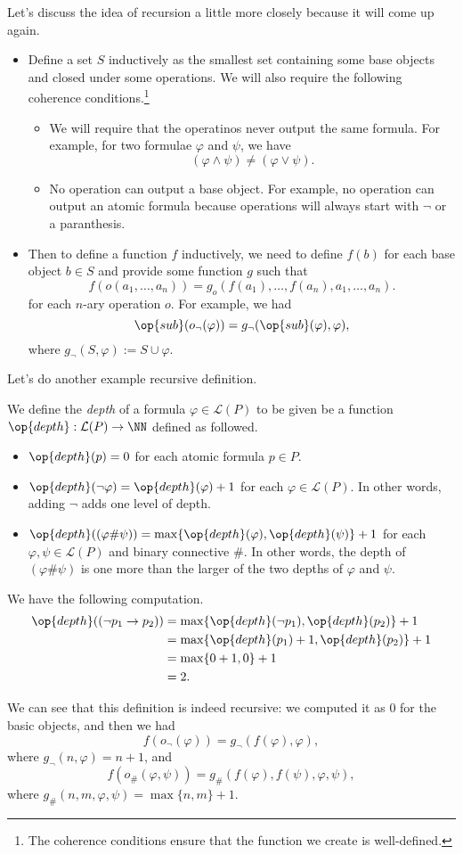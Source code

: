 Let's discuss the idea of recursion a little more closely because it will come up again.
\begin{itemize}
	\item Define a set $S$ inductively as the smallest set containing some base objects and closed under some operations. We will also require the following coherence conditions.\footnote{The coherence conditions ensure that the function we create is well-defined.}
	\begin{itemize}
		\item We will require that the operatinos never output the same formula. For example, for two formulae $\varphi$ and $\psi$, we have
		\[(\varphi\land\psi)\ne(\varphi\lor\psi).\]
		\item No operation can output a base object. For example, no operation can output an atomic formula because operations will always start with $\lnot$ or a paranthesis.
	\end{itemize}
	\item Then to define a function $f$ inductively, we need to define $f(b)$ for each base object $b\in S$ and provide some function $g$ such that
	\[f(o(a_1,\ldots,a_n))=g_o(f(a_1),\ldots,f(a_n),a_1,\ldots,a_n).\]
	for each $n$-ary operation $o$. For example, we had
	\[\op{sub}(o_\lnot(\varphi))=g_\lnot(\op{sub}(\varphi),\varphi),\]
	where $g_\lnot(S,\varphi):=S\cup\varphi$.
\end{itemize}
Let's do another example recursive definition.
\begin{definition}[Depth]
	We define the \textit{depth} of a formula $\varphi\in\mathcal L(P)$ to be given be a function $\op{depth}:\mathcal L(P)\to\NN$ defined as followed.
	\begin{itemize}
		\item $\op{depth}(p)=0$ for each atomic formula $p\in P$.
		\item $\op{depth}(\lnot\varphi)=\op{depth}(\varphi)+1$ for each $\varphi\in\mathcal L(P)$. In other words, adding $\lnot$ adds one level of depth.
		\item $\op{depth}((\varphi\#\psi))=\max\{\op{depth}(\varphi),\op{depth}(\psi)\}+1$ for each $\varphi,\psi\in\mathcal L(P)$ and binary connective $\#$. In other words, the depth of $(\varphi\#\psi)$ is one more than the larger of the two depths of $\varphi$ and $\psi$.
	\end{itemize}
\end{definition}
\begin{example}
	We have the following computation.
	\begin{align*}
		\op{depth}((\lnot p_1\to p_2)) &= \max\{\op{depth}(\lnot p_1),\op{depth}(p_2)\}+1 \\
		&= \max\{\op{depth}(p_1)+1,\op{depth}(p_2)\}+1 \\
		&= \max\{0+1,0\}+1 \\
		&= 2.
	\end{align*}
\end{example}
We can see that this definition is indeed recursive: we computed it as $0$ for the basic objects, and then we had
\[f(o_\lnot(\varphi))=g_\lnot(f(\varphi),\varphi),\]
where $g_\lnot(n,\varphi)=n+1$, and
\[f(o_\#(\varphi,\psi))=g_\#(f(\varphi),f(\psi),\varphi,\psi),\]
where $g_\#(n,m,\varphi,\psi)=\max\{n,m\}+1$.